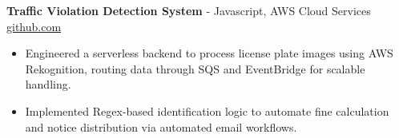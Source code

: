 \documentclass[11pt]{article}       %
\begin{document}

\textbf{Traffic Violation Detection System}{ - Javascript, AWS Cloud Services} \hfill \href{https://github.com/Monica20030707/AWS_rekonigition-N-read-database}{github.com} \\
\vspace{-9pt}
\begin{itemize}
  \item Engineered a serverless backend to process license plate images using AWS Rekognition, routing data through SQS and EventBridge for scalable handling.
  \item Implemented Regex-based identification logic to automate fine calculation and notice distribution via automated email workflows.
\end{itemize}

\end{document}
